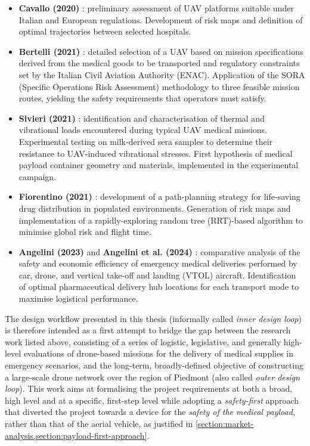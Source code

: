 \begin{itemize}
    \item \textbf{Cavallo (2020)} \cite{Cavallo2020}: preliminary assessment of UAV platforms suitable under Italian and European regulations. Development of risk maps and definition of optimal trajectories between selected hospitals.
    \item \textbf{Bertelli (2021)} \cite{Bertelli2021}: detailed selection of a UAV based on mission specifications derived from the medical goods to be transported and regulatory constraints set by the Italian Civil Aviation Authority (ENAC). Application of the SORA (Specific Operations Risk Assessment) methodology to three feasible mission routes, yielding the safety requirements that operators must satisfy.
    \item \textbf{Sivieri (2021)} \cite{Sivieri2021}: identification and characterisation of thermal and vibrational loads encountered during typical UAV medical missions. Experimental testing on milk-derived sera samples to determine their resistance to UAV-induced vibrational stresses. First hypothesis of medical payload container geometry and materials, implemented in the experimental campaign.
    \item \textbf{Fiorentino (2021)} \cite{Fiorentino2021}: development of a path-planning strategy for life-saving drug distribution in populated environments. Generation of risk maps and implementation of a rapidly-exploring random tree (RRT)-based algorithm to minimise global risk and flight time.
    \item \textbf{Angelini (2023)} \cite{Angelini2023} and \textbf{Angelini et al. (2024)} \cite{Angelini2024ICAS}: comparative analysis of the safety and economic efficiency of emergency medical deliveries performed by car, drone, and vertical take-off and landing (VTOL) aircraft. Identification of optimal pharmaceutical delivery hub locations for each transport mode to maximise logistical performance.
\end{itemize}

The design workflow presented in this thesis (informally called \textit{inner design loop}) is therefore intended as a first attempt to bridge the gap between the research work listed above, consisting of a series of logistic, legislative, and generally high-level evaluations of drone-based missions for the delivery of medical supplies in emergency scenarios, and the long-term, broadly-defined objective of constructing a large-scale drone network over the region of Piedmont (also called \textit{outer design loop}). This work aims at formalising the project requirements at both a broad, high level and at a specific, first-step level while adopting a \textit{safety-first} approach that diverted the project towards a device for the \textit{safety of the medical payload}, rather than that of the aerial vehicle, as justified in \cref{section:market-analysis,section:payload-first-approach}.


